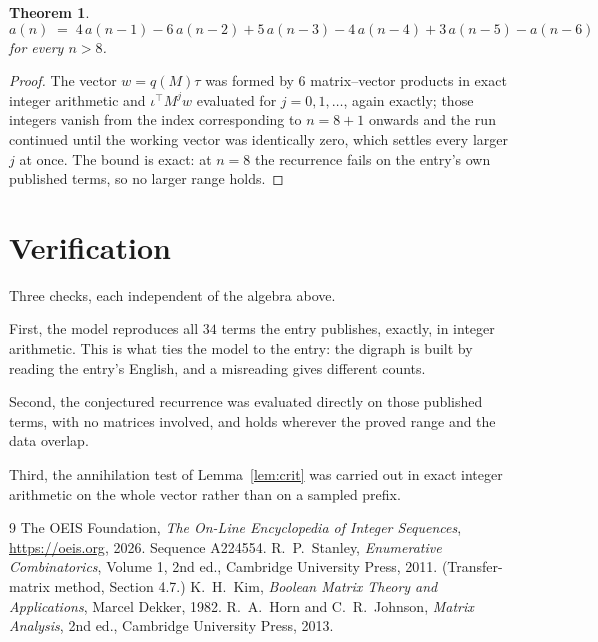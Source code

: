 \documentclass[11pt,a4paper]{article}
\theoremstyle{plain}
\newtheorem{theorem}{Theorem}
\theoremstyle{definition}
\begin{document}
\begin{theorem}
\[
a(n)\;=\;4\,a(n-1) - 6\,a(n-2) + 5\,a(n-3) - 4\,a(n-4) + 3\,a(n-5) - a(n-6)
\]
for every $n>8$.
\end{theorem}

\begin{proof}
The vector $w=q(M)\tau$ was formed by $6$ matrix--vector products in exact integer
arithmetic and $\iota^{\!\top}M^{j}w$ evaluated for $j=0,1,\dots$, again exactly; those
integers vanish from the index corresponding to $n=8+1$ onwards and the run continued
until the working vector was identically zero, which settles every larger $j$ at once. The bound is exact: at $n=8$ the recurrence fails on the entry's own published terms, so no larger range holds.
\end{proof}

\section{Verification}

Three checks, each independent of the algebra above.

First, the model reproduces all $34$ terms the entry publishes, exactly, in integer
arithmetic. This is what ties the model to the entry: the digraph is built by reading the
entry's English, and a misreading gives different counts.

Second, the conjectured recurrence was evaluated directly on those published terms, with no
matrices involved, and holds wherever the proved range and the data overlap.

Third, the annihilation test of Lemma~\ref{lem:crit} was carried out in exact integer
arithmetic on the whole vector rather than on a sampled prefix.

\begin{thebibliography}{9}
 The OEIS Foundation, \emph{The On-Line Encyclopedia of Integer
Sequences}, \url{https://oeis.org}, 2026. Sequence A224554.
 R.~P.~Stanley, \emph{Enumerative Combinatorics}, Volume 1, 2nd ed.,
Cambridge University Press, 2011. (Transfer-matrix method, Section 4.7.)
 K.~H.~Kim, \emph{Boolean Matrix Theory and Applications}, Marcel Dekker,
1982.
 R.~A.~Horn and C.~R.~Johnson, \emph{Matrix Analysis}, 2nd ed., Cambridge
University Press, 2013.
\end{thebibliography}
\end{document}
